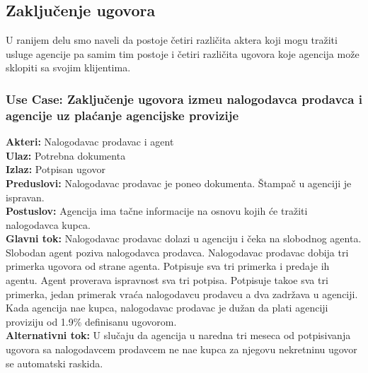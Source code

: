 \documentclass{article}
\begin{document}
\newpage
\subsection{\bfseries Zaklju\v {c}enje ugovora}
\indent U ranijem delu smo naveli da postoje \v {c}etiri razli\v {c}ita aktera koji mogu tra\v {z}iti usluge agencije pa samim tim postoje i \v {c}etiri razli\v {c}ita ugovora koje agencija mo\v {z}e sklopiti sa svojim klijentima. \\ 
\subsubsection{\bfseries Use Case: Zaklju\v {c}enje ugovora izme\dj u nalogodavca prodavca i agencije uz pla\' canje agencijske provizije}

{\bfseries Akteri:} Nalogodavac prodavac i agent\\
{\bfseries Ulaz:} Potrebna dokumenta\\
{\bfseries Izlaz:} Potpisan ugovor\\
{\bfseries Preduslovi:} Nalogodavac prodavac je poneo dokumenta. \v {S}tampa\v {c} u agenciji je ispravan. \\
{\bfseries Postuslov:} Agencija ima ta\v {c}ne informacije na osnovu kojih \' ce tra\v {z}iti nalogodavca kupca. \\
{\bfseries Glavni tok:} Nalogodavac prodavac dolazi u agenciju i \v {c}eka na slobodnog agenta. Slobodan agent poziva nalogodavca prodavca. Nalogodavac prodavac dobija tri primerka ugovora od strane agenta. Potpisuje sva tri primerka i predaje ih agentu. Agent proverava ispravnost sva tri potpisa. Potpisuje tako\dj e sva tri primerka, jedan primerak vra\' ca nalogodavcu prodavcu a dva zadr\v {z}ava u agenciji. Kada agencija na\dj e kupca, nalogodavac prodavac je du\v {z}an da plati agenciji proviziju od 1.9\% definisanu ugovorom. \\
{\bfseries Alternativni tok:} U slu\v {c}aju da agencija u naredna tri meseca od potpisivanja ugovora sa nalogodavcem prodavcem ne na\dj e kupca za njegovu nekretninu ugovor se automatski raskida. \\
\end{document}

